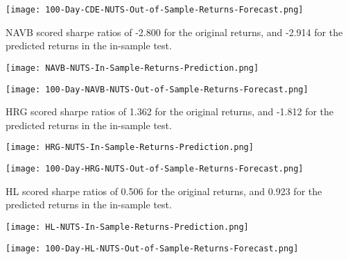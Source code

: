 \begin{center}  
    \texttt{[image: 100-Day-CDE-NUTS-Out-of-Sample-Returns-Forecast.png]}
    \label{fig:nonfloat}
\end{center}

NAVB scored sharpe ratios of -2.800 for the original returns, and -2.914 for the predicted returns in the in-sample test.

\begin{center}
    \texttt{[image: NAVB-NUTS-In-Sample-Returns-Prediction.png]}
    \label{fig:nonfloat}
\end{center}

\begin{center}  
    \texttt{[image: 100-Day-NAVB-NUTS-Out-of-Sample-Returns-Forecast.png]}
    \label{fig:nonfloat}
\end{center}

HRG scored sharpe ratios of 1.362 for the original returns, and -1.812 for the predicted returns in the in-sample test.

\begin{center}
    \texttt{[image: HRG-NUTS-In-Sample-Returns-Prediction.png]}
    \label{fig:nonfloat}
\end{center}

\begin{center}  
    \texttt{[image: 100-Day-HRG-NUTS-Out-of-Sample-Returns-Forecast.png]}
    \label{fig:nonfloat}
\end{center}

HL scored sharpe ratios of 0.506 for the original returns, and 0.923 for the predicted returns in the in-sample test.

\begin{center}
    \texttt{[image: HL-NUTS-In-Sample-Returns-Prediction.png]}
    \label{fig:nonfloat}
\end{center}

\begin{center}  
    \texttt{[image: 100-Day-HL-NUTS-Out-of-Sample-Returns-Forecast.png]}
    \label{fig:nonfloat}
\end{center}

